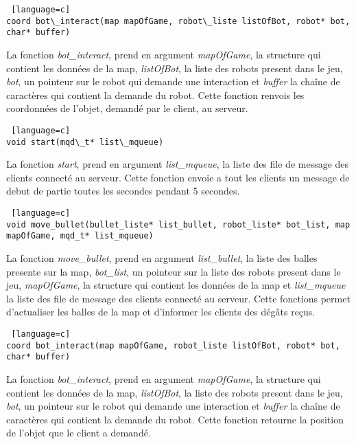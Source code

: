 \documentclass[a4paper, 11pt]{article}
\begin{document}
\begin {lstlisting} [language=c]
coord bot\_interact(map mapOfGame, robot\_liste listOfBot, robot* bot, char* buffer)
\end{lstlisting}
La fonction \emph{bot\_interact}, prend en argument \emph{mapOfGame}, la structure qui contient les données de la map, \emph{listOfBot}, la liste des robots present dans le jeu, \emph{bot}, un pointeur sur le robot qui demande une interaction et \emph{buffer} la chaîne de caractères qui contient la demande du robot. Cette fonction renvois les coordonnées de l'objet, demandé par le client, au serveur.\\

\begin {lstlisting} [language=c]
void start(mqd\_t* list\_mqueue)
\end{lstlisting}
La fonction \emph{start}, prend en argument \emph{list\_mqueue}, la liste des file de message des clients connecté au serveur. Cette fonction envoie a tout les clients un message de debut de partie toutes les secondes pendant 5 secondes.\\

\begin {lstlisting} [language=c]
void move_bullet(bullet_liste* list_bullet, robot_liste* bot_list, map mapOfGame, mqd_t* list_mqueue)
\end{lstlisting}
La fonction \emph{move\_bullet}, prend en argument \emph{list\_bullet}, la liste des balles presente sur la map, \emph{bot\_list}, un pointeur sur la liste des robots present dans le jeu, \emph{mapOfGame}, la structure qui contient les données de la map et \emph{list\_mqueue} la liste des file de message des clients connecté au serveur. Cette fonctions permet d'actualiser les balles de la map et d'informer les clients des dégâts reçus.\\

\begin {lstlisting} [language=c]
coord bot_interact(map mapOfGame, robot_liste listOfBot, robot* bot, char* buffer)
\end{lstlisting}
La fonction \emph{bot\_interact}, prend en argument \emph{mapOfGame}, la structure qui contient les données de la map, \emph{listOfBot}, la liste des robots present dans le jeu, \emph{bot}, un pointeur sur le robot qui demande une interaction et \emph{buffer} la chaîne de caractères qui contient la demande du robot. Cette fonction retourne la position de l'objet que le client a demandé.\\
\end{document}
